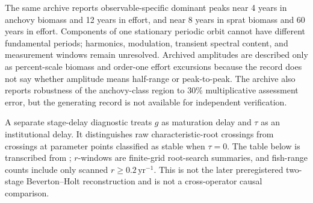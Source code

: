 The same archive reports observable-specific dominant peaks near 4 years in anchovy biomass and 12 years in effort, and near 8 years in sprat biomass and 60 years in effort. Components of one stationary periodic orbit cannot have different fundamental periods; harmonics, modulation, transient spectral content, and measurement windows remain unresolved. Archived amplitudes are described only as percent-scale biomass and order-one effort excursions because the record does not say whether amplitude means half-range or peak-to-peak. The archive also reports robustness of the anchovy-class region to 30\% multiplicative assessment error, but the generating record is not available for independent verification.

A separate stage-delay diagnostic treats \(g\) as maturation delay and \(\tau\) as an institutional delay. It distinguishes raw characteristic-root crossings from crossings at parameter points classified as stable when \(\tau=0\). The table below is transcribed from \texttt{}; \(r\)-windows are finite-grid root-search summaries, and fish-range counts include only scanned \(r\geq0.2\,\mathrm{yr}^{-1}\). This is not the later preregistered two-stage Beverton--Holt reconstruction and is not a cross-operator causal comparison.


